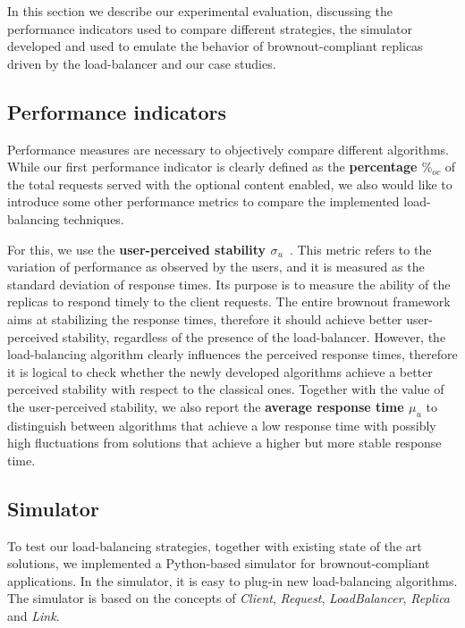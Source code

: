 In this section we describe our experimental evaluation, discussing
the performance indicators used to compare different strategies, the
simulator developed and used to emulate the behavior of
brownout-compliant replicas driven by the load-balancer and our case
studies.

\subsection{Performance indicators}

Performance measures are necessary to objectively compare different
algorithms. While our first performance indicator is clearly defined
as the \textbf{percentage $\%_{oc}$} of the total requests served with
the optional content enabled, we also would like to introduce some
other performance metrics to compare the implemented load-balancing
techniques.

For this, we use the \textbf{user-perceived stability
  $\sigma_u$}~\cite{GeograficalSASO}. This metric refers to the
variation of performance as observed by the users, and it is measured
as the standard deviation of response times. Its purpose is to measure
the ability of the replicas to respond timely to the client
requests. The entire brownout framework aims at stabilizing the
response times, therefore it should achieve better user-perceived
stability, regardless of the presence of the load-balancer. However,
the load-balancing algorithm clearly influences the perceived
response times, therefore it is logical to check whether the newly
developed algorithms achieve a better perceived stability with respect
to the classical ones. Together with the value of the user-perceived
stability, we also report the \textbf{average response time $\mu_u$}
to distinguish between algorithms that achieve a low response time
with possibly high fluctuations from solutions that achieve a higher
but more stable response time.

\subsection{Simulator}

To test our load-balancing strategies, together with existing state of
the art solutions, we implemented a Python-based simulator for
brownout-compliant applications. In the simulator, it is easy to
plug-in new load-balancing algorithms. The simulator is based on the
concepts of \emph{Client}, \emph{Request}, \emph{LoadBalancer},
\emph{Replica} and \emph{Link}.

